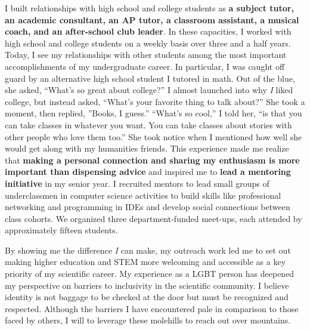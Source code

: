 \noindent
\underline{}
I built relationships with high school and college students as \textbf{a subject tutor, an academic consultant, an AP tutor, a classroom assistant, a musical coach, and an after-school club leader}.
In these capacities, I worked with high school and college students on a weekly basis over three and a half years.
Today, I see my relationships with other students among the most important accomplishments of my undergraduate career.
In particular, I was caught off guard by an alternative high school student I tutored in math.
Out of the blue, she asked, ``What's so great about college?''
I almost launched into why \textit{I} liked college, but instead asked, ``What's your favorite thing to talk about?''
She took a moment, then replied, ''Books, I guess.''
``What's so cool,'' I told her, ``is that you can take classes in whatever you want.
You can take classes about stories with other people who love them too.''
She took notice when I mentioned how well she would get along with my humanities friends.
This experience made me realize that \textbf{making a personal connection and sharing my enthusiasm is more important than dispensing advice} and inspired me to \textbf{lead a mentoring initiative} in my senior year.
I recruited mentors to lead small groups of underclassmen in computer science activities to build skills like professional networking and programming in IDEs and develop social connections between class cohorts.
We organized three department-funded meet-ups, each attended by approximately fifteen students.

By showing me the difference \textit{I} can make, my outreach work led me to set out making higher education and STEM more welcoming and accessible as a key priority of my scientific career.
My experience as a LGBT person has deepened my perspective on barriers to inclusivity in the scientific community.
I believe identity is not baggage to be checked at the door but must be recognized and respected.
Although the barriers I have encountered pale in comparison to those faced by others, I will to leverage these molehills to reach out over mountains.
